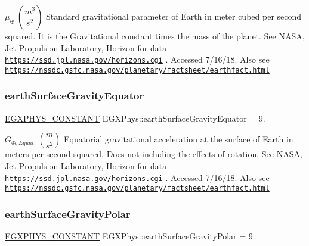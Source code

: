 $ \mu_{\oplus} \ (\dfrac{m^3}{s^2})$ Standard gravitational parameter of Earth in meter cubed per second squared. It is the Gravitational constant times the mass of the planet. See N\+A\+SA, Jet Propulsion Laboratory, Horizon for data \href{https://ssd.jpl.nasa.gov/horizons.cgi}{\tt https\+://ssd.\+jpl.\+nasa.\+gov/horizons.\+cgi} . Accessed 7/16/18. Also see \href{https://nssdc.gsfc.nasa.gov/planetary/factsheet/earthfact.html}{\tt https\+://nssdc.\+gsfc.\+nasa.\+gov/planetary/factsheet/earthfact.\+html} \mbox{\label{group___e_g_x_phys-_constants-_astrophysics-_solar_system-_earth-_bulk_ga16734192d073e46f32dc0e296b2f99a6}} 
\subsubsection{\texorpdfstring{earth\+Surface\+Gravity\+Equator}{earthSurfaceGravityEquator}}
{\footnotesize\ttfamily \mbox{\hyperlink{group___e_g_x_phys-_constants-_macros_ga76980d288494ce1714c9ac68a95ba702}{E\+G\+X\+P\+H\+Y\+S\+\_\+\+C\+O\+N\+S\+T\+A\+NT}} E\+G\+X\+Phys\+::earth\+Surface\+Gravity\+Equator = 9.}

$ G_{\oplus,Equat.} \ (\dfrac{m}{s^2})$ Equatorial gravitational acceleration at the surface of Earth in meters per second squared. Does not including the effects of rotation. See N\+A\+SA, Jet Propulsion Laboratory, Horizon for data \href{https://ssd.jpl.nasa.gov/horizons.cgi}{\tt https\+://ssd.\+jpl.\+nasa.\+gov/horizons.\+cgi} . Accessed 7/16/18. Also see \href{https://nssdc.gsfc.nasa.gov/planetary/factsheet/earthfact.html}{\tt https\+://nssdc.\+gsfc.\+nasa.\+gov/planetary/factsheet/earthfact.\+html} \mbox{\label{group___e_g_x_phys-_constants-_astrophysics-_solar_system-_earth-_bulk_ga874fc1db4f316a31102432881fd60ab3}} 
\subsubsection{\texorpdfstring{earth\+Surface\+Gravity\+Polar}{earthSurfaceGravityPolar}}
{\footnotesize\ttfamily \mbox{\hyperlink{group___e_g_x_phys-_constants-_macros_ga76980d288494ce1714c9ac68a95ba702}{E\+G\+X\+P\+H\+Y\+S\+\_\+\+C\+O\+N\+S\+T\+A\+NT}} E\+G\+X\+Phys\+::earth\+Surface\+Gravity\+Polar = 9.}

